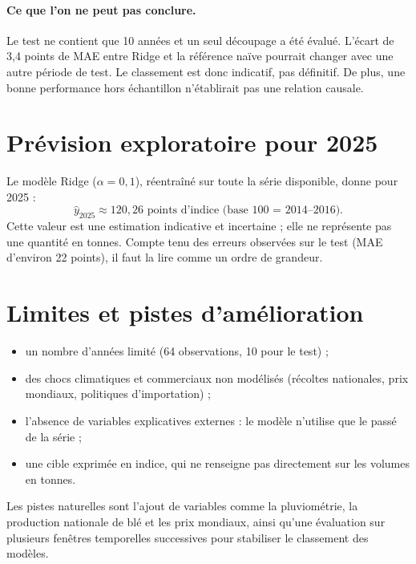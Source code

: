 \documentclass[11pt,a4paper]{article}
\begin{document}
\paragraph{Ce que l'on ne peut pas conclure.} Le test ne contient que 10 années et un seul découpage a été évalué. L'écart de 3,4 points de MAE entre Ridge et la référence naïve pourrait changer avec une autre période de test. Le classement est donc indicatif, pas définitif. De plus, une bonne performance hors échantillon n'établirait pas une relation causale.

\section{Prévision exploratoire pour 2025}

Le modèle Ridge ($\alpha=0{,}1$), réentraîné sur toute la série disponible, donne pour 2025 :
\[
\hat{y}_{2025}\approx 120{,}26 \text{ points d'indice (base 100 = 2014--2016).}
\]
Cette valeur est une estimation indicative et incertaine ; elle ne représente pas une quantité en tonnes. Compte tenu des erreurs observées sur le test (MAE d'environ 22 points), il faut la lire comme un ordre de grandeur.

\section{Limites et pistes d'amélioration}

\begin{itemize}
  \item un nombre d'années limité (64 observations, 10 pour le test) ;
  \item des chocs climatiques et commerciaux non modélisés (récoltes nationales, prix mondiaux, politiques d'importation) ;
  \item l'absence de variables explicatives externes : le modèle n'utilise que le passé de la série ;
  \item une cible exprimée en indice, qui ne renseigne pas directement sur les volumes en tonnes.
\end{itemize}
Les pistes naturelles sont l'ajout de variables comme la pluviométrie, la production nationale de blé et les prix mondiaux, ainsi qu'une évaluation sur plusieurs fenêtres temporelles successives pour stabiliser le classement des modèles.

\end{document}
